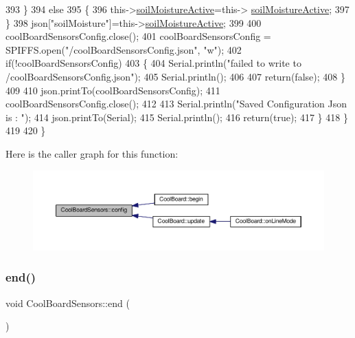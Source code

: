 \begin{DoxyCode}
393             \}
394             \textcolor{keywordflow}{else}
395             \{
396                 this->\hyperlink{classCoolBoardSensors_a31983eecc0f9cd000e1f912206ea4dc8}{soilMoistureActive}=this->
      \hyperlink{classCoolBoardSensors_a31983eecc0f9cd000e1f912206ea4dc8}{soilMoistureActive};
397             \}
398             json[\textcolor{stringliteral}{"soilMoisture"}]=this->\hyperlink{classCoolBoardSensors_a31983eecc0f9cd000e1f912206ea4dc8}{soilMoistureActive};
399 
400             coolBoardSensorsConfig.close();         
401             coolBoardSensorsConfig = SPIFFS.open(\textcolor{stringliteral}{"/coolBoardSensorsConfig.json"}, \textcolor{stringliteral}{"w"});          
402             \textcolor{keywordflow}{if}(!coolBoardSensorsConfig)
403             \{
404                 Serial.println(\textcolor{stringliteral}{"failed to write to /coolBoardSensorsConfig.json"});
405                 Serial.println();
406 
407                 \textcolor{keywordflow}{return}(\textcolor{keyword}{false});          
408             \}  
409 
410             json.printTo(coolBoardSensorsConfig);
411             coolBoardSensorsConfig.close();         
412             
413             Serial.println(\textcolor{stringliteral}{"Saved Configuration Json is : "});
414             json.printTo(Serial);
415             Serial.println();
416             \textcolor{keywordflow}{return}(\textcolor{keyword}{true}); 
417         \}
418     \}   
419 
420 \}
\end{DoxyCode}
Here is the caller graph for this function\+:\nopagebreak
\begin{figure}[H]
\begin{center}
\leavevmode
\includegraphics[width=350pt]{classCoolBoardSensors_a9a218895c5423375c33c08f2c56fb23a_icgraph}
\end{center}
\end{figure}
\mbox{\label{classCoolBoardSensors_a4902b69f6e628bd6557193758fdd2bae}} 
\subsubsection{\texorpdfstring{end()}{end()}}
{\footnotesize\ttfamily void Cool\+Board\+Sensors\+::end (\begin{DoxyParamCaption}{ }\end{DoxyParamCaption})}

